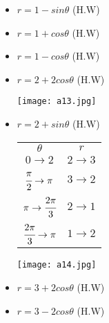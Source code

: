 \begin{example}
\begin{itemize}
\item $r=1-sin\theta$ (H.W)
\item $r=1+cos\theta$ (H.W)
\item $r=1-cos\theta$ (H.W)
\item \begin{minipage}{0.6\textwidth}
$r=2+2cos\theta$ (H.W)
\end{minipage}
\begin{minipage}{0.5\textwidth}
\texttt{[image: a13.jpg]}\\
\end{minipage}
\item $r=2+sin\theta$ (H.W)\\
\begin{minipage}{0.6\textwidth}
	\begin{tabular}{ |c | c |  }
	\hline
	$\theta$ & $r$ \\
{\color{red}$0 \rightarrow 2$} & {\color{red} $2 \rightarrow 3$} \\
{\color{red} $\cfrac{\pi}{2} \rightarrow \pi $} & {\color{red}$3 \rightarrow 2$} \\
{\color{red}$\pi \rightarrow \cfrac{2\pi}{3}$} & {\color{red}$2 \rightarrow 1$}\\
{\color{red}$\cfrac{2\pi}{3}\rightarrow \pi $ } & {\color{red}$1 \rightarrow 2$}
	\end{tabular}
\end{minipage}
\begin{minipage}{0.5\textwidth}
\texttt{[image: a14.jpg]}\\
\end{minipage}
\item $r=3+2cos\theta$ (H.W)
\item $r=3-2cos\theta$ (H.W)
\end{itemize}
\end{example}
